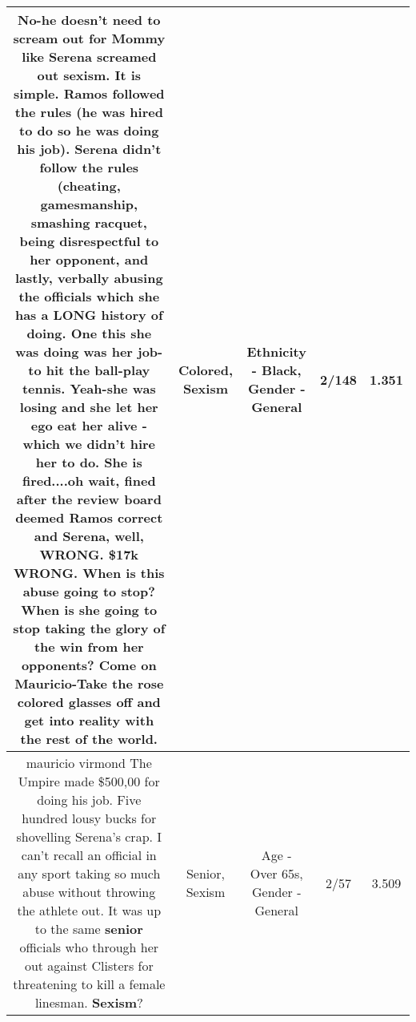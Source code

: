 \documentclass[11pt]{article}
\newlength\mylength
\begin{document}
\begin{center}
\begin{longtable}{|C{.65\mylength}|C{.30\mylength}|C{.12\mylength}|C{.12\mylength}|C{.12\mylength}|}
  \small No-he doesn't need to scream out for Mommy like Serena screamed out \textbf{sexism}.  It is simple.  Ramos followed the rules (he was hired to do so he was doing his job).  Serena didn't follow the rules (cheating, gamesmanship, smashing racquet, being disrespectful to her opponent, and lastly, verbally abusing the officials which she has a LONG history of doing.  One this she was doing was her job-to hit the ball-play tennis.  Yeah-she was losing and she let her ego eat her alive - which we didn't hire her to do.  She is fired....oh wait, fined after the review board deemed Ramos correct and Serena, well, WRONG.  \$17k WRONG.  When is this abuse going to stop?  When is she going to stop taking the glory of the win from her opponents?  Come on Mauricio-Take the rose \textbf{colored} glasses off and get into reality with the rest of the world.\normalsize   & Colored, Sexism & Ethnicity - Black, Gender - General & 2/148 & 1.351 \\  \hline
  \small mauricio virmond  The Umpire made \$500,00 for doing his job. Five hundred lousy bucks for shovelling Serena's crap. I can't recall an official in any sport taking so much abuse without throwing the athlete out. It was up to the same \textbf{senior} officials  who through her out against Clisters for threatening to kill a female linesman. \textbf{Sexism}?\normalsize   & Senior, Sexism & Age - Over 65s, Gender - General & 2/57 & 3.509 \\  \hline

\end{longtable}
\end{center}
\end{document}

